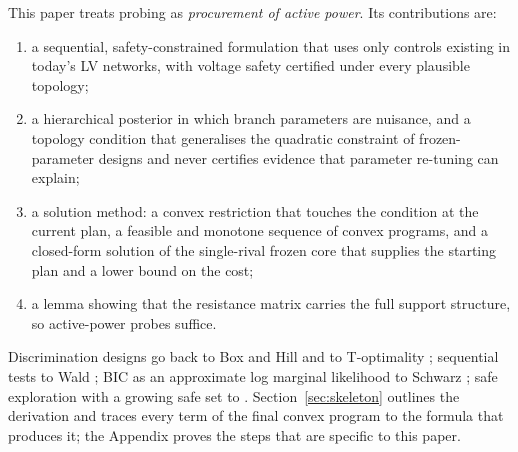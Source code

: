 \documentclass[journal,onecolumn,11pt]{IEEEtran}
\begin{document}
This paper treats probing as \emph{procurement of active power}. Its contributions are:
\begin{enumerate}
\item a sequential, safety-constrained formulation that uses only controls existing in today's LV networks, with voltage safety certified under every plausible topology;
\item a hierarchical posterior in which branch parameters are nuisance, and a topology condition that generalises the quadratic constraint of frozen-parameter designs and never certifies evidence that parameter re-tuning can explain;
\item a solution method: a convex restriction that touches the condition at the current plan, a feasible and monotone sequence of convex programs, and a closed-form solution of the single-rival frozen core that supplies the starting plan and a lower bound on the cost;
\item a lemma showing that the resistance matrix carries the full support structure, so active-power probes suffice.
\end{enumerate}
Discrimination designs go back to Box and Hill \cite{boxhill1967} and to T-optimality \cite{atkinson1975}; sequential tests to Wald \cite{wald1945}; BIC as an approximate log marginal likelihood to Schwarz \cite{schwarz1978}; safe exploration with a growing safe set to \cite{sui2015}. Section~\ref{sec:skeleton} outlines the derivation and traces every term of the final convex program to the formula that produces it; the Appendix proves the steps that are specific to this paper.

\end{document}
